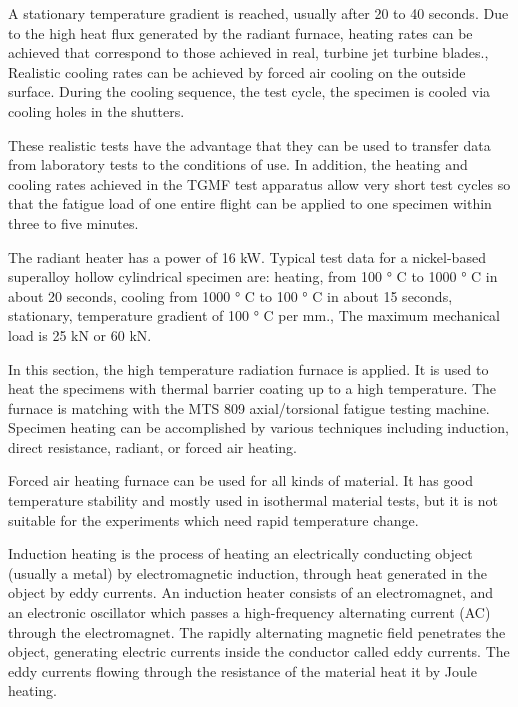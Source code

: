 A stationary temperature gradient is reached, usually after 20 to 40 seconds. Due to the high heat flux generated by the radiant furnace, heating rates can be achieved that correspond to those achieved in real, turbine jet turbine blades., Realistic cooling rates can be achieved by forced air cooling on the outside surface. During the cooling sequence, the test cycle, the specimen is cooled via cooling holes in the shutters.

These realistic tests have the advantage that they can be used to transfer data from laboratory tests to the conditions of use. In addition, the heating and cooling rates achieved in the TGMF test apparatus allow very short test cycles so that the fatigue load of one entire flight can be applied to one specimen within three to five minutes.

The radiant heater has a power of 16 kW. Typical test data for a nickel-based superalloy hollow cylindrical specimen are: heating, from 100 ° C to 1000 ° C in about 20 seconds, cooling from 1000 ° C to 100 ° C in about 15 seconds, stationary, temperature gradient of 100 ° C per mm., The maximum mechanical load is 25 kN or 60 kN.

In this section, the high temperature radiation furnace is applied.
It is used to heat the specimens with thermal barrier coating up to a high temperature.
The furnace is matching with the MTS 809 axial/torsional fatigue testing machine.
Specimen heating can be accomplished by various techniques including induction, direct resistance, radiant, or forced air heating.

Forced air heating furnace can be used for all kinds of material. It has good temperature stability and mostly used in isothermal material tests, but it is not suitable for the experiments which need rapid temperature change.

Induction heating is the process of heating an electrically conducting object (usually a metal) by electromagnetic induction, through heat generated in the object by eddy currents. An induction heater consists of an electromagnet, and an electronic oscillator which passes a high-frequency alternating current (AC) through the electromagnet. The rapidly alternating magnetic field penetrates the object, generating electric currents inside the conductor called eddy currents. The eddy currents flowing through the resistance of the material heat it by Joule heating.

